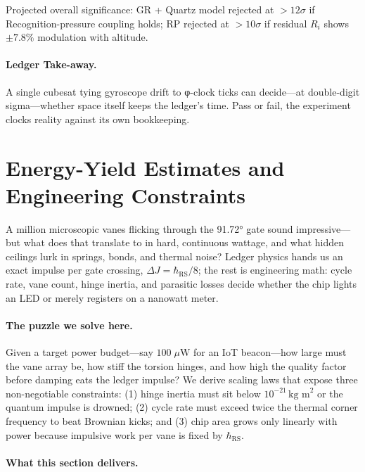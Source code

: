 \documentclass[11pt,oneside]{book}
\begin{document}
Projected overall significance:  
GR + Quartz model rejected at \(>12\sigma\) if Recognition-pressure
coupling holds; RP rejected at \(>10\sigma\) if residual
\(R_i\) shows \( \pm 7.8\%\) modulation with altitude.

\paragraph{Ledger Take-away.}
A single cubesat tying gyroscope drift to φ-clock ticks can decide—at
double-digit sigma—whether space itself keeps the ledger’s time.  Pass
or fail, the experiment clocks reality against its own bookkeeping.


\section{Energy-Yield Estimates and Engineering Constraints}
\label{sec:yield-constraints}

A million microscopic vanes flicking through the 91.72° gate sound impressive—but what does that translate to in hard, continuous wattage, and what hidden ceilings lurk in springs, bonds, and thermal noise?  
Ledger physics hands us an exact impulse per gate crossing,
\(\Delta J=\hbar_{\mathrm{RS}}/8\); the rest is engineering math:
cycle rate, vane count, hinge inertia, and parasitic losses decide
whether the chip lights an LED or merely registers on a nanowatt
meter.

\paragraph{The puzzle we solve here.}
Given a target power budget—say \(100\;\mu\text{W}\) for an IoT
beacon—how large must the vane array be, how stiff the torsion hinges,
and how high the quality factor before damping eats the ledger
impulse?  
We derive scaling laws that expose three non-negotiable constraints:
(1) hinge inertia must sit below \(10^{-21}\,\text{kg m}^{2}\) or the
quantum impulse is drowned; (2) cycle rate must exceed twice the
thermal corner frequency to beat Brownian kicks; and (3) chip area
grows only linearly with power because impulsive work per vane is
fixed by \(\hbar_{\mathrm{RS}}\).

\paragraph{What this section delivers.}
\end{document}
